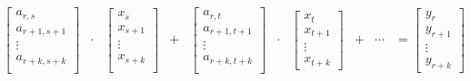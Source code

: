\documentclass{article}
\begin{document}
      \begin{equation}
        \begin{matrix}
          \begin{bmatrix}
            a_{r,s}     \\
            a_{r+1,s+1} \\
               \vdots   \\
            a_{r+k,s+k} \\
          \end{bmatrix} & \cdot & \begin{bmatrix}
                                    x_s      \\
                                    x_{s+1}  \\
                                      \vdots \\
                                    x_{s+k}  \\
                                  \end{bmatrix} & + & \begin{bmatrix}
                                                      a_{r,t}     \\
                                                      a_{r+1,t+1} \\
                                                        \vdots    \\
                                                      a_{r+k,t+k} \\
                                                      \end{bmatrix} & \cdot & \begin{bmatrix}
                                                                                x_t \\
                                                                                x_{t+1} \\
                                                                                \vdots \\
                                                                                x_{t+k}
                                                                              \end{bmatrix} & + & \cdots & = \begin{bmatrix}
                                                                                                                 y_{r} \\
                                                                                                                 y_{r+1} \\
                                                                                                                 \vdots \\
                                                                                                                 y_{r+k}
                                                                                                                \end{bmatrix}
        \end{matrix}
      \end{equation}
\end{document}
